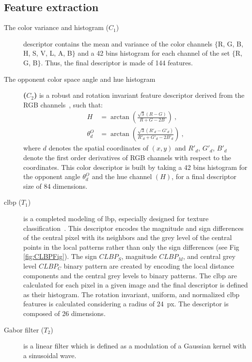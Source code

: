 \subsection{Feature extraction}\label{sec:feat}

\begin{description}
\item[The color variance and histogram ($C_{1}$)] descriptor contains the mean and variance of the color channels $\{$R, G, B, H, S, V, L, A, B$\}$ and a 42 bins histogram for each channel of the set $\{$R, G, B$\}$. Thus, the final descriptor is made of 144 features.
\item[The opponent color space angle and hue histogram] \textbf{($C_{2}$)} is a robust and rotation invariant feature descriptor derived from the RGB channels~\cite{van2006coloring}, such that:
  \begin{align}\label{Eq:AngO}
    H &= \arctan\left(\frac{\sqrt{3}\left(R-G\right)}{R+G-2B}\right) \ , \nonumber \\
    \theta^{O}_{d} &= \arctan \left( \frac{\sqrt{3}\left(R'_{d}-G'_{d}\right)}{R'_{d}+G'_{d}-2B'_{d}}\right) \ ,
  \end{align}
\noindent where $d$ denotes the spatial coordinates of $(x,y)$ and $R'_{d}$, $G'_{d}$, $B'_{d}$ denote the first order derivatives of RGB channels with respect to the coordinates. 
This color descriptor is built by taking a 42 bins histogram for the opponent angle $\theta^{O}_{d}$ and the hue channel $(H)$, for a final descriptor size of 84 dimensions.
\item[\ac{clbp} ($T_{1}$)] is a completed modeling of \Ac{lbp}, especially designed for texture classification~\cite{guo2010completed}. 
This descriptor encodes the magnitude and sign differences of the central pixel with its neighbors and the grey level of the central points in the local patterns rather than only the sign differences (see Fig\,\ref{fig:CLBPFig}). 
The sign $CLBP_S$, magnitude $CLBP_M$, and central grey level $CLBP_C$ binary pattern are created by encoding the local distance components and the central grey levels to binary patterns.  
The \ac{clbp} are calculated for each pixel in a given image and the final descriptor is defined as their histogram.
The rotation invariant, uniform, and normalized \ac{clbp} features is calculated considering a radius of \SI{24}{px}.
The descriptor is composed of 26 dimensions.
\item[Gabor filter ($T_{2}$)] is a linear filter which is defined as a modulation of a Gaussian kernel with a sinusoidal wave. 

\end{description}
